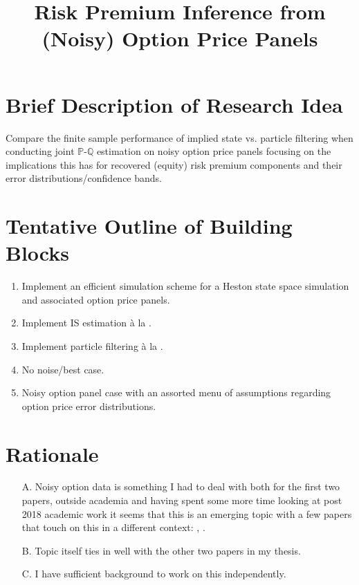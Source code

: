 \documentclass[11pt,a4paper,notitlepage]{article}
\author{ %
	    }
\title{\vspace*{-55pt} Risk Premium Inference from (Noisy) Option Price Panels \vspace*{-35pt}}
\date{\item First version: June 16, 2018 \item Previous Version: August 6, 2026 \item This version: September 25, 2026}
\numberwithin{equation}{section}
\begin{document}
\maketitle

\onehalfspacing

\section*{Brief Description of Research Idea}
Compare the finite sample performance of implied state vs. particle filtering when conducting joint $\mathbb{P}$-$\mathbb{Q}$	estimation on noisy option price panels focusing on the implications this has for recovered (equity) risk premium components and their error distributions/confidence bands. 

\section*{Tentative Outline of Building Blocks}
\begin{enumerate}
\item Implement an efficient simulation scheme for a Heston \citep{heston} state space simulation and associated option price panels.
\item Implement IS estimation \`{a} la \cite{boswijk2015asset}.
\item Implement particle filtering \`{a} la \cite{hurn2015pf}.
\item No noise/best case.
\item Noisy option panel case with an assorted menu of assumptions regarding option price error distributions.
\end{enumerate}

\section*{Rationale}
\begin{enumerate}
\item[A.] Noisy option data is something I had to deal with both for the first two papers, outside academia and having spent some more time looking at post 2018 academic work it seems that this is an emerging topic with a few papers that touch on this in a different context: \cite{andersen2021spatial}, \cite{duarte2024very}.
\item[B.] Topic itself ties in well with the other two papers in my thesis.
\item[C.] I have sufficient background to work on this independently.
\end{enumerate}
\end{document}
